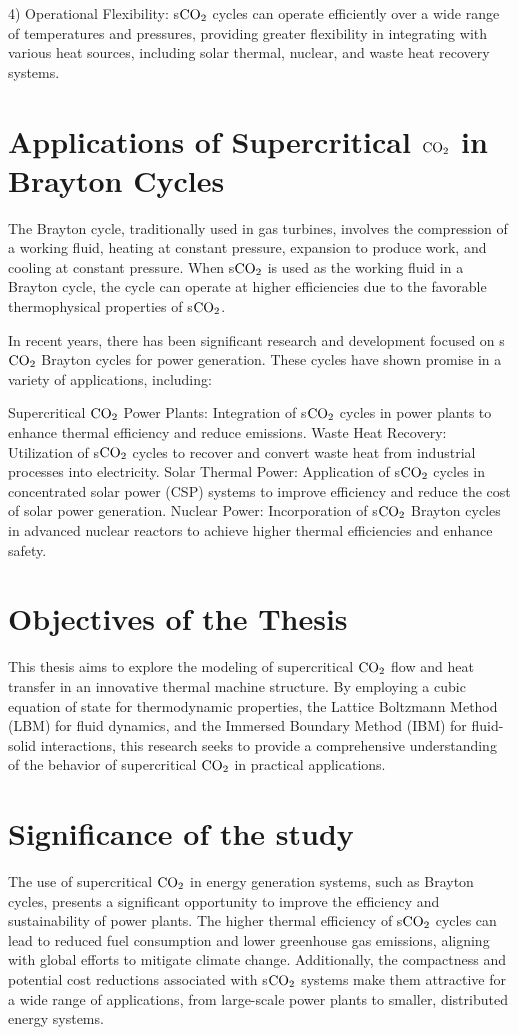 4) Operational Flexibility: s$\ce{CO2}$ cycles can operate efficiently over a wide range of temperatures and pressures, providing greater flexibility in integrating with various heat sources, including solar thermal, nuclear, and waste heat recovery systems.

\section*{Applications of Supercritical $\ce{CO2}$ in Brayton Cycles}
The Brayton cycle, traditionally used in gas turbines, involves the compression of a working fluid, heating at constant pressure, expansion to produce work, and cooling at constant pressure. When s$\ce{CO2}$ is used as the working fluid in a Brayton cycle, the cycle can operate at higher efficiencies due to the favorable thermophysical properties of s$\ce{CO2}$.

In recent years, there has been significant research and development focused on s$\ce{CO2}$ Brayton cycles for power generation. These cycles have shown promise in a variety of applications, including:

    Supercritical $\ce{CO2}$ Power Plants: Integration of s$\ce{CO2}$ cycles in power plants to enhance thermal efficiency and reduce emissions.
    Waste Heat Recovery: Utilization of s$\ce{CO2}$ cycles to recover and convert waste heat from industrial processes into electricity.
    Solar Thermal Power: Application of s$\ce{CO2}$ cycles in concentrated solar power (CSP) systems to improve efficiency and reduce the cost of solar power generation.
    Nuclear Power: Incorporation of s$\ce{CO2}$ Brayton cycles in advanced nuclear reactors to achieve higher thermal efficiencies and enhance safety.

\section*{Objectives of the Thesis}
This thesis aims to explore the modeling of supercritical $\ce{CO2}$ flow and heat transfer in an innovative thermal machine structure. By employing a cubic equation of state for thermodynamic
properties, the Lattice Boltzmann Method (LBM) for fluid dynamics, and the Immersed Boundary Method (IBM) for fluid-solid interactions, this research seeks to provide a comprehensive
understanding of the behavior of supercritical $\ce{CO2}$ in practical applications.

\section*{Significance of the study}
The use of supercritical $\ce{CO2}$ in energy generation systems, such as Brayton cycles, presents a significant opportunity to improve the efficiency and sustainability of power plants.
The higher thermal efficiency of s$\ce{CO2}$ cycles can lead to reduced fuel consumption and lower greenhouse gas emissions, aligning with global efforts to mitigate climate change. 
Additionally, the compactness and potential cost reductions associated with s$\ce{CO2}$ systems make them attractive for a wide range of applications, from large-scale power plants 
to smaller, distributed energy systems.

